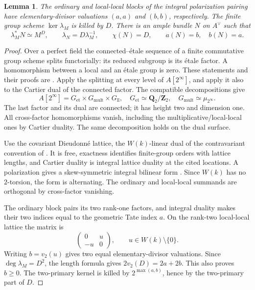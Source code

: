 \documentclass[11pt]{article}
\newtheorem{lemma}[theorem]{Lemma}
\theoremstyle{definition}\newtheorem{definition}[theorem]{Definition}
\theoremstyle{remark}\newtheorem{remark}[theorem]{Remark}
\begin{document}
\begin{lemma}\label{lem:p10blocks}
The ordinary and local-local blocks of the integral polarization pairing have elementary-divisor valuations $(a,a)$ and $(b,b)$, respectively. The finite group scheme $\ker\lambda_M$ is killed by $D$. There is an ample bundle $N$ on $A^\vee$ such that
\[
 \lambda_M^*N\simeq M^D,\qquad
 \lambda_N=D\lambda_M^{-1},\qquad
 \chi(N)=D,\qquad a(N)=b,\quad b(N)=a.
\]
\end{lemma}
\begin{proof}
Over a perfect field the connected--\'etale sequence of a finite commutative group scheme splits functorially: its reduced subgroup is its \'etale factor. A homomorphism between a local and an \'etale group is zero. These statements and their proofs are \citet[Lemma~4.44 and Proposition~4.45, p.~67]{EGM}. Apply the splitting at every level of $A[2^\infty]$, and apply it also to the Cartier dual of the connected factor. The compatible decompositions give
\[
 A[2^\infty]=G_{\mathrm{et}}\times G_{\mathrm{mult}}\times G_{\mathrm{ll}},
 \quad G_{\mathrm{et}}\simeq\mathbf Q_2/\mathbf Z_2,
 \quad G_{\mathrm{mult}}\simeq\mu_{2^\infty}.
\]
The last factor and its dual are connected; it has height two and dimension one. All cross-factor homomorphisms vanish, including the multiplicative/local-local ones by Cartier duality. The same decomposition holds on the dual surface.

Use the covariant Dieudonn\'e lattice, the $W(k)$-linear dual of the contravariant convention of \citet{Oda1969}. It is free, exactness identifies finite-group orders with lattice lengths, and Cartier duality is integral lattice duality at the cited locations. A polarization gives a skew-symmetric integral bilinear form \citep[Propositions~1.10 and 1.12, pp.~75--76; Proposition~3.24(ii), pp.~100--101]{Oda1969}. Since $W(k)$ has no $2$-torsion, the form is alternating. The ordinary and local-local summands are orthogonal by cross-factor vanishing.

The ordinary block pairs its two rank-one factors, and integral duality makes their two indices equal to the geometric Tate index $a$. On the rank-two local-local lattice the matrix is
\[
 \begin{pmatrix}0&u\\-u&0\end{pmatrix},\qquad u\in W(k)\setminus\{0\}.
\]
Writing $b=v_2(u)$ gives two equal elementary-divisor valuations. Since $\deg\lambda_M=D^2$, the length formula gives $2v_2(D)=2a+2b$. This also proves $b\ge0$. The two-primary kernel is killed by $2^{\max(a,b)}$, hence by the two-primary part of $D$.


\end{proof}
\end{document}
